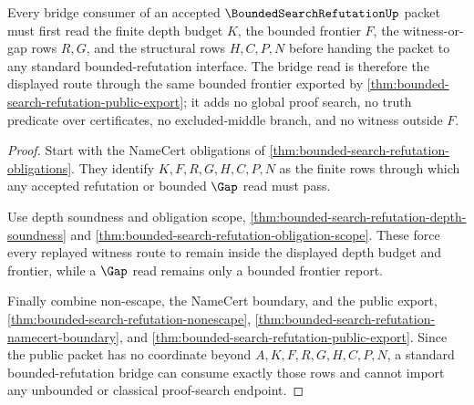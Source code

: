 \begin{theorem}
\label{thm:bounded-search-refutation-bounded-frontier-bridge}
Every bridge consumer of an accepted $\BoundedSearchRefutationUp$ packet must first read the finite depth budget $K$, the bounded frontier $F$, the witness-or-gap rows $R,G$, and the structural rows $H,C,P,N$ before handing the packet to any standard bounded-refutation interface. The bridge read is therefore the displayed route through the same bounded frontier exported by \autoref{thm:bounded-search-refutation-public-export}; it adds no global proof search, no truth predicate over certificates, no excluded-middle branch, and no witness outside $F$.
\end{theorem}
\begin{proof}
Start with the NameCert obligations of \autoref{thm:bounded-search-refutation-obligations}. They identify $K,F,R,G,H,C,P,N$ as the finite rows through which any accepted refutation or bounded $\Gap$ read must pass.

Use depth soundness and obligation scope, \autoref{thm:bounded-search-refutation-depth-soundness} and \autoref{thm:bounded-search-refutation-obligation-scope}. These force every replayed witness route to remain inside the displayed depth budget and frontier, while a $\Gap$ read remains only a bounded frontier report.

Finally combine non-escape, the NameCert boundary, and the public export, \autoref{thm:bounded-search-refutation-nonescape}, \autoref{thm:bounded-search-refutation-namecert-boundary}, and \autoref{thm:bounded-search-refutation-public-export}. Since the public packet has no coordinate beyond $A,K,F,R,G,H,C,P,N$, a standard bounded-refutation bridge can consume exactly those rows and cannot import any unbounded or classical proof-search endpoint.
\end{proof}


